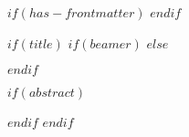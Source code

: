 $if(has-frontmatter)$
\frontmatter
$endif$


$if(title)$
$if(beamer)$
\frame{\titlepage}
$else$
\maketitle
$endif$

\restoregeometry

$if(abstract)$
\begin{abstract}
$abstract$
\end{abstract}
$endif$
$endif$